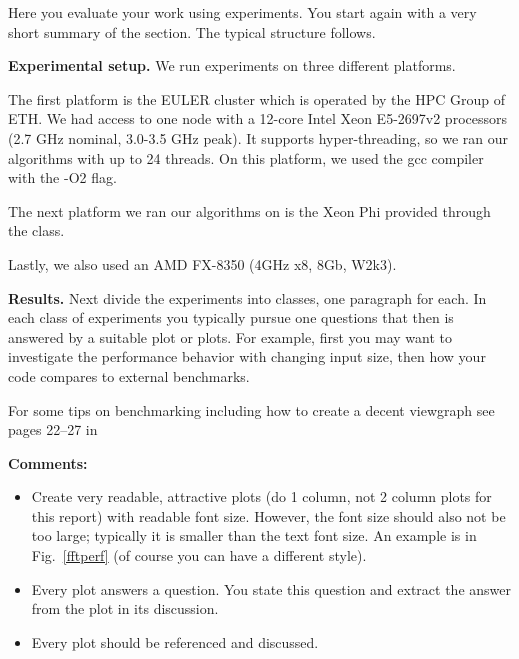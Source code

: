 \documentclass[letterpaper]{article}
\newcommand{\mypar}[1]{{\bf #1.}} %
\begin{document}
	Here you evaluate your work using experiments. You start again with a
	very short summary of the section. The typical structure follows.
	
	\mypar{Experimental setup}
	We run experiments on three different platforms.
	
	The first platform is the EULER cluster which is operated by the HPC Group of ETH. 
	We had access to one node with a 12-core Intel Xeon E5-2697v2 processors (2.7 GHz nominal, 3.0-3.5 GHz peak). 
	It supports hyper-threading, so we ran our algorithms with up to 24 threads. 
	On this platform, we used the gcc compiler with the -O2 flag.
	
	The next platform we ran our algorithms on is the Xeon Phi provided through the class.
	
	Lastly, we also used an AMD FX-8350 (4GHz x8, 8Gb, W2k3).
	
	\mypar{Results}
	Next divide the experiments into classes, one paragraph for each. In each class of experiments you typically pursue one questions that then is answered by a suitable plot or plots. For example, first you may want to investigate the performance behavior with changing input size, then how your code compares to external benchmarks.
	
	For some tips on benchmarking including how to create a decent viewgraph see pages 22--27 in
	
	
	
	{\bf Comments:}
	\begin{itemize}
	\item Create very readable, attractive plots (do 1 column, not 2 column plots
	for this report) with readable font size. However, the font size should also not be too large; typically it is smaller than the text font size.
	An example is in Fig.~\ref{fftperf} (of course you can have a different style).
	\item Every plot answers a question. You state this question and extract the
	answer from the plot in its discussion.
	\item Every plot should be referenced and discussed.
	\end{itemize}
	
\end{document}
